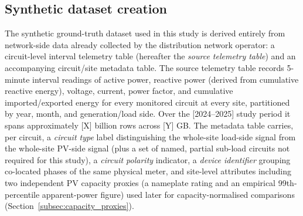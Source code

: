 
\subsection{Synthetic dataset creation}
\label{subsec:dataset_creation}

The synthetic ground-truth dataset used in this study is derived entirely
from network-side data already collected by the distribution network
operator: a circuit-level interval telemetry table (hereafter the
\emph{source telemetry table}) and an accompanying circuit/site metadata
table. The source telemetry table records 5-minute interval readings of
active power, reactive power (derived from cumulative reactive energy),
voltage, current, power factor, and cumulative imported/exported energy
for every monitored circuit at every site, partitioned by year, month, and
generation/load side. Over the [2024--2025] study period it spans
approximately [X] billion rows across [Y] GB. The metadata table carries,
per circuit, a \emph{circuit type} label distinguishing the whole-site
load-side signal from the whole-site PV-side signal (plus a set of
named, partial sub-load circuits not required for this study), a
\emph{circuit polarity} indicator, a \emph{device identifier} grouping
co-located phases of the same physical meter, and site-level attributes
including two independent PV capacity proxies (a nameplate rating and an
empirical 99th-percentile apparent-power figure) used later for
capacity-normalised comparisons (Section~\ref{subsec:capacity_proxies}).

